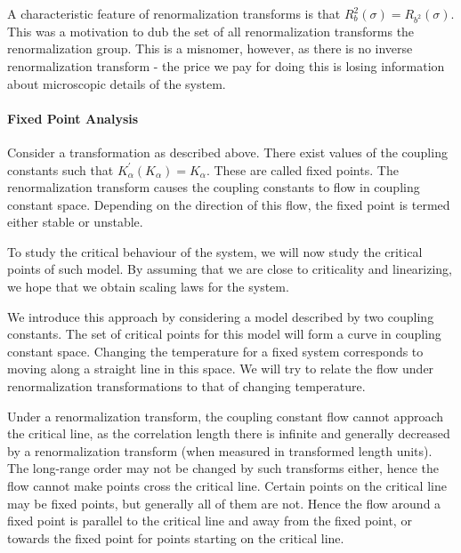 A characteristic feature of renormalization transforms is that $R_{b}^{2}(\sigma) = R_{b^{2}}(\sigma)$. This was a motivation to dub the set of all renormalization transforms the renormalization group. This is a misnomer, however, as there is no inverse renormalization transform - the price we pay for doing this is losing information about microscopic details of the system.

\paragraph{Fixed Point Analysis}
Consider a transformation as described above. There exist values of the coupling constants such that $K_{\alpha}^{\prime}(K_{\alpha}) = K_{\alpha}$. These are called fixed points. The renormalization transform causes the coupling constants to flow in coupling constant space. Depending on the direction of this flow, the fixed point is termed either stable or unstable.

To study the critical behaviour of the system, we will now study the critical points of such model. By assuming that we are close to criticality and linearizing, we hope that we obtain scaling laws for the system.

We introduce this approach by considering a model described by two coupling constants. The set of critical points for this model will form a curve in coupling constant space. Changing the temperature for a fixed system corresponds to moving along a straight line in this space. We will try to relate the flow under renormalization transformations to that of changing temperature.

Under a renormalization transform, the coupling constant flow cannot approach the critical line, as the correlation length there is infinite and generally decreased by a renormalization transform (when measured in transformed length units). The long-range order may not be changed by such transforms either, hence the flow cannot make points cross the critical line. Certain points on the critical line may be fixed points, but generally all of them are not. Hence the flow around a fixed point is parallel to the critical line and away from the fixed point, or towards the fixed point for points starting on the critical line.

